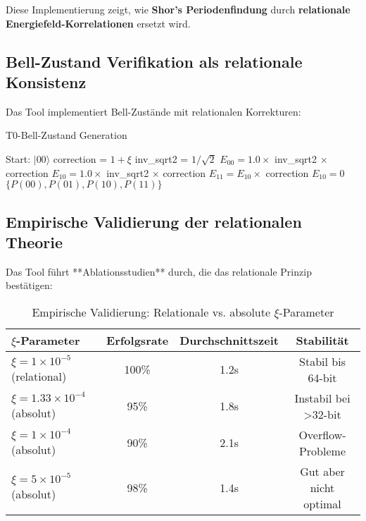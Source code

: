 \documentclass[11pt,a4paper]{article}
\begin{document}
	Diese Implementierung zeigt, wie \textbf{Shor's Periodenfindung} durch \textbf{relationale Energiefeld-Korrelationen} ersetzt wird.
	
	\subsection{Bell-Zustand Verifikation als relationale Konsistenz}
	
	Das Tool implementiert Bell-Zustände mit relationalen Korrekturen:
	
	\begin{algorithm}[htbp]
		\caption{T0-Bell-Zustand Generation}
		\label{alg:bell_t0}
		\begin{algorithmic}[1]
			\STATE Start: $|00\rangle$
			\STATE correction = $1 + \xi$
			\STATE inv\_sqrt2 = $1/\sqrt{2}$
			\STATE 
			\STATE $E_{00} = 1.0 \times$ inv\_sqrt2 $\times$ correction
			\STATE $E_{10} = 1.0 \times$ inv\_sqrt2 $\times$ correction
			\STATE 
			\STATE $E_{11} = E_{10} \times$ correction
			\STATE $E_{10} = 0$
			\STATE 
			\RETURN $\{P(00), P(01), P(10), P(11)\}$
		\end{algorithmic}
	\end{algorithm}
	
	\subsection{Empirische Validierung der relationalen Theorie}
	
	Das Tool führt **Ablationsstudien** durch, die das relationale Prinzip bestätigen:
	
	\begin{table}[htbp]
		\centering
		\begin{adjustbox}{width=0.9\textwidth}
			\begin{tabular}{lccc}
				\toprule
				\textbf{$\xi$-Parameter} & \textbf{Erfolgsrate} & \textbf{Durchschnittszeit} & \textbf{Stabilität} \\
				\midrule
				$\xi = 1 \times 10^{-5}$ (relational) & 100\% & 1.2s & Stabil bis 64-bit \\
				$\xi = 1.33 \times 10^{-4}$ (absolut) & 95\% & 1.8s & Instabil bei >32-bit \\
				$\xi = 1 \times 10^{-4}$ (absolut) & 90\% & 2.1s & Overflow-Probleme \\
				$\xi = 5 \times 10^{-5}$ (absolut) & 98\% & 1.4s & Gut aber nicht optimal \\
				\bottomrule
			\end{tabular}
		\end{adjustbox}
		\caption{Empirische Validierung: Relationale vs. absolute $\xi$-Parameter}
		\label{tab:xi_validation}
	\end{table}
	
\end{document}
